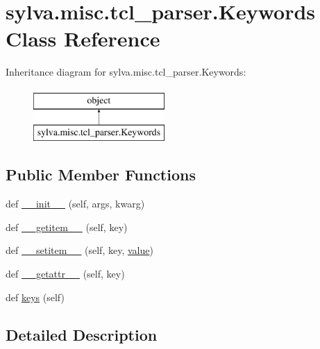 \hypertarget{classsylva_1_1misc_1_1tcl__parser_1_1_keywords}{}\section{sylva.\+misc.\+tcl\+\_\+parser.\+Keywords Class Reference}
\label{classsylva_1_1misc_1_1tcl__parser_1_1_keywords}
Inheritance diagram for sylva.\+misc.\+tcl\+\_\+parser.\+Keywords\+:\begin{figure}[H]
\begin{center}
\leavevmode
\includegraphics[height=2.000000cm]{classsylva_1_1misc_1_1tcl__parser_1_1_keywords}
\end{center}
\end{figure}
\subsection*{Public Member Functions}
\begin{DoxyCompactItemize}
\item 
def \hyperlink{classsylva_1_1misc_1_1tcl__parser_1_1_keywords_a4b7a15b3c0639416663e46d942c9b9be}{\+\_\+\+\_\+init\+\_\+\+\_\+} (self, args, kwarg)
\item 
def \hyperlink{classsylva_1_1misc_1_1tcl__parser_1_1_keywords_ae638df94fbcd53ba58d430f33daef296}{\+\_\+\+\_\+getitem\+\_\+\+\_\+} (self, key)
\item 
def \hyperlink{classsylva_1_1misc_1_1tcl__parser_1_1_keywords_a3472d59fe7173f29ba51f1153a8d9710}{\+\_\+\+\_\+setitem\+\_\+\+\_\+} (self, key, \hyperlink{namespacesylva_1_1misc_1_1tcl__parser_a83a1a4d978bc1a8a1bd92f71b754bad9}{value})
\item 
def \hyperlink{classsylva_1_1misc_1_1tcl__parser_1_1_keywords_a0a9e148d0396587905bf17d93d3cac1a}{\+\_\+\+\_\+getattr\+\_\+\+\_\+} (self, key)
\item 
def \hyperlink{classsylva_1_1misc_1_1tcl__parser_1_1_keywords_aab14f0aa36691de260b7c63be5ad6ee9}{keys} (self)
\end{DoxyCompactItemize}


\subsection{Detailed Description}


